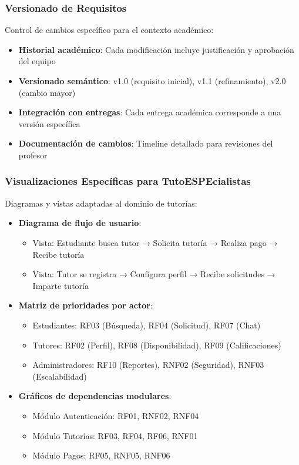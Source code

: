 \documentclass[12pt,a4paper]{article}
\begin{document}
\subsubsection{Versionado de Requisitos}

Control de cambios específico para el contexto académico:

\begin{itemize}
    \item \textbf{Historial académico}: Cada modificación incluye justificación y aprobación del equipo
    \item \textbf{Versionado semántico}: v1.0 (requisito inicial), v1.1 (refinamiento), v2.0 (cambio mayor)
    \item \textbf{Integración con entregas}: Cada entrega académica corresponde a una versión específica
    \item \textbf{Documentación de cambios}: Timeline detallado para revisiones del profesor
\end{itemize}

\subsubsection{Visualizaciones Específicas para TutoESPEcialistas}

Diagramas y vistas adaptadas al dominio de tutorías:

\begin{itemize}
    \item \textbf{Diagrama de flujo de usuario}:
    \begin{itemize}
        \item Vista: Estudiante busca tutor → Solicita tutoría → Realiza pago → Recibe tutoría
        \item Vista: Tutor se registra → Configura perfil → Recibe solicitudes → Imparte tutoría
    \end{itemize}
    \item \textbf{Matriz de prioridades por actor}:
    \begin{itemize}
        \item Estudiantes: RF03 (Búsqueda), RF04 (Solicitud), RF07 (Chat)
        \item Tutores: RF02 (Perfil), RF08 (Disponibilidad), RF09 (Calificaciones)
        \item Administradores: RF10 (Reportes), RNF02 (Seguridad), RNF03 (Escalabilidad)
    \end{itemize}
    \item \textbf{Gráficos de dependencias modulares}:
    \begin{itemize}
        \item Módulo Autenticación: RF01, RNF02, RNF04
        \item Módulo Tutorías: RF03, RF04, RF06, RNF01
        \item Módulo Pagos: RF05, RNF05, RNF06
    \end{itemize}
\end{itemize}
\end{document}
